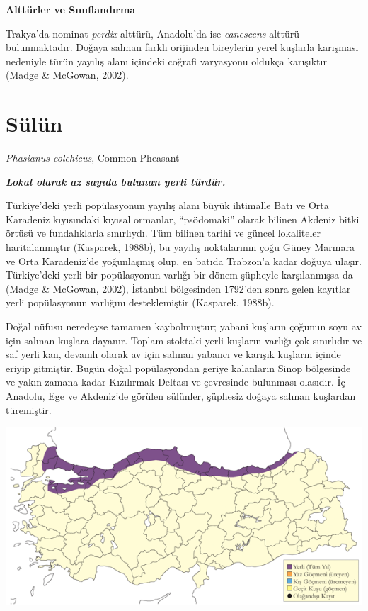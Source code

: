 \documentclass[
  a4paper,
  DIV=11,
  numbers=noendperiod]{scrreprt}
\begin{document}
\textbf{Alttürler ve Sınıflandırma}

Trakya'da nominat \emph{perdix} alttürü, Anadolu'da ise \emph{canescens}
alttürü bulunmaktadır. Doğaya salınan farklı orijinden bireylerin yerel
kuşlarla karışması nedeniyle türün yayılış alanı içindeki coğrafi
varyasyonu oldukça karışıktır (Madge \& McGowan, 2002).

\section{Sülün}\label{suxfcluxfcn}

\emph{Phasianus colchicus}, Common Pheasant

\textbf{\emph{Lokal olarak az sayıda bulunan yerli türdür.}}

Türkiye'deki yerli popülasyonun yayılış alanı büyük ihtimalle Batı ve
Orta Karadeniz kıyısındaki kıyısal ormanlar, ``psödomaki'' olarak
bilinen Akdeniz bitki örtüsü ve fundalıklarla sınırlıydı. Tüm bilinen
tarihi ve güncel lokaliteler haritalanmıştır (Kasparek, 1988b), bu
yayılış noktalarının çoğu Güney Marmara ve Orta Karadeniz'de yoğunlaşmış
olup, en batıda Trabzon'a kadar doğuya ulaşır. Türkiye'deki yerli bir
popülasyonun varlığı bir dönem şüpheyle karşılanmışsa da (Madge \&
McGowan, 2002), İstanbul bölgesinden 1792'den sonra gelen kayıtlar yerli
popülasyonun varlığını desteklemiştir (Kasparek, 1988b).

Doğal nüfusu neredeyse tamamen kaybolmuştur; yabani kuşların çoğunun
soyu av için salınan kuşlara dayanır. Toplam stoktaki yerli kuşların
varlığı çok sınırlıdır ve saf yerli kan, devamlı olarak av için salınan
yabancı ve karışık kuşların içinde eriyip gitmiştir. Bugün doğal
popülasyondan geriye kalanların Sinop bölgesinde ve yakın zamana kadar
Kızılırmak Deltası ve çevresinde bulunması olasıdır. İç Anadolu, Ege ve
Akdeniz'de görülen sülünler, şüphesiz doğaya salınan kuşlardan
türemiştir.

\includegraphics{images/harita_Page_044.png}
\end{document}
